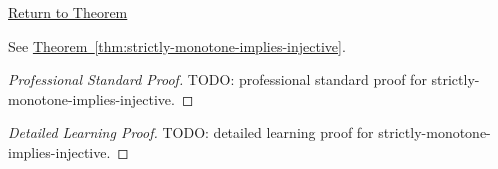 \newpage
{}
\label{prf:strictly-monotone-implies-injective}

\begin{remark*}[Return]
\hyperref[thm:strictly-monotone-implies-injective]{Return to Theorem}
\end{remark*}

\begin{theorem*}
See \hyperref[thm:strictly-monotone-implies-injective]{Theorem~\ref*{thm:strictly-monotone-implies-injective}}.
\end{theorem*}

\begin{proof}[Professional Standard Proof]
\LRAProofBodyStart
TODO: professional standard proof for strictly-monotone-implies-injective.
\end{proof}

\begin{proof}[Detailed Learning Proof]
\LRAProofBodyStart
TODO: detailed learning proof for strictly-monotone-implies-injective.
\end{proof}

\begin{remark*}
\end{remark*}

\begin{dependencies}
\NoLocalDependencies
\end{dependencies}

\clearpage
